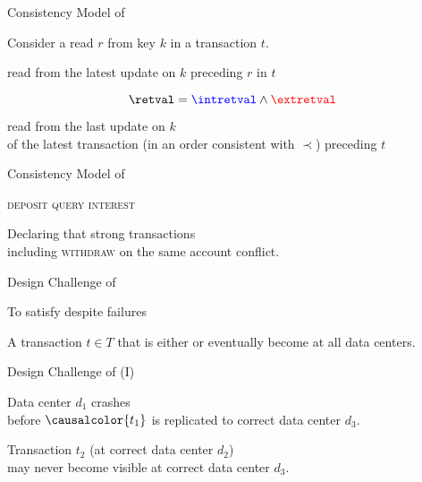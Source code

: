 \begin{frame}{Consistency Model of \unistore}
  \begin{center}
    Consider a read $r$ from key $k$ in a transaction $t$.

    \vspace{0.80cm}
    \blue{$\intretval:$} read from the latest update on $k$ preceding $r$ in $t$

    \[
      \retval = \blue{\intretval} \land \red{\extretval}
    \]

    \vspace{0.50cm}
    \red{$\extretval:$} read from the last update on $k$ \\[3pt]
    of the latest transaction (in an order consistent with $\prec$) preceding $t$
  \end{center}
\end{frame}

\begin{frame}{Consistency Model of \unistore}
  \begin{center}
    \textsc{deposit \quad {} \quad query \quad interest}

    \vspace{0.50cm}
    Declaring that strong transactions \\[3pt]
    including \textsc{withdraw} on the same account conflict.
  \end{center}
\end{frame}

\begin{frame}{Design Challenge of \unistore}
  \begin{center}
    {To satisfy  despite failures}

    \vspace{0.50cm}
    A transaction $t \in T$ that is either 
    or 
    eventually become  at all  data centers.
  \end{center}
\end{frame}

\begin{frame}{Design Challenge of \unistore{} (I)}
  \begin{center}
    {Data center $d_{1}$ crashes \\[3pt]
    before $\causalcolor{t_{1}}$ is replicated to correct data center $d_{3}$.}

    \vspace{0.20cm}

    \pause
    Transaction $t_{2}$ (at correct data center $d_{2}$) \\[3pt]
    may never become visible at correct data center $d_{3}$.
  \end{center}
\end{frame}

